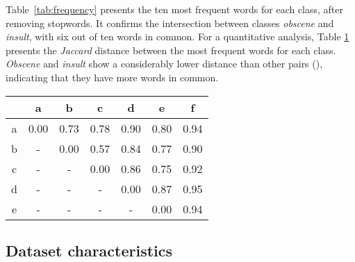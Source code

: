 \documentclass[11pt,a4paper]{article}
\begin{document}
Table~\ref{tab:frequency} presents the ten most frequent words for each class, after removing stopwords. It confirms the intersection between classes \textit{obscene} and \textit{insult}, with six out of ten words in common. For a quantitative analysis, Table \ref{jaccard} presents the \textit{Jaccard} distance between the  most frequent words for each class. \textit{Obscene} and \textit{insult} show a considerably lower distance than other pairs (), indicating that they have more words in common.

\begin{table}
\centering
\begin{tabular}{@{}ccccccc@{}}
\toprule
                       & a    & b    & c    & d    & e    & f    \\ \midrule
\multicolumn{1}{c|}{a} & 0.00 & 0.73 & 0.78 & 0.90 & 0.80 & 0.94 \\
\multicolumn{1}{c|}{b} & - & 0.00 & 0.57 & 0.84 & 0.77 & 0.90 \\
\multicolumn{1}{c|}{c} & - & - & 0.00 & 0.86 & 0.75 & 0.92 \\
\multicolumn{1}{c|}{d} & - & - & - & 0.00 & 0.87 & 0.95 \\
\multicolumn{1}{c|}{e} & - & - & - & - & 0.00 & 0.94 \\
\bottomrule
\end{tabular}
 \label{jaccard}
\end{table}



\subsection{Dataset characteristics}
\end{document}
